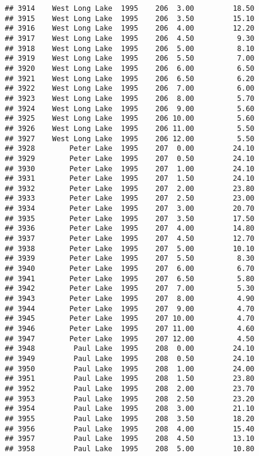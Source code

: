 \documentclass[
]{article}
\begin{document}
\begin{verbatim}
## 3914    West Long Lake  1995    206  3.00         18.50
## 3915    West Long Lake  1995    206  3.50         15.10
## 3916    West Long Lake  1995    206  4.00         12.20
## 3917    West Long Lake  1995    206  4.50          9.30
## 3918    West Long Lake  1995    206  5.00          8.10
## 3919    West Long Lake  1995    206  5.50          7.00
## 3920    West Long Lake  1995    206  6.00          6.50
## 3921    West Long Lake  1995    206  6.50          6.20
## 3922    West Long Lake  1995    206  7.00          6.00
## 3923    West Long Lake  1995    206  8.00          5.70
## 3924    West Long Lake  1995    206  9.00          5.60
## 3925    West Long Lake  1995    206 10.00          5.60
## 3926    West Long Lake  1995    206 11.00          5.50
## 3927    West Long Lake  1995    206 12.00          5.50
## 3928        Peter Lake  1995    207  0.00         24.10
## 3929        Peter Lake  1995    207  0.50         24.10
## 3930        Peter Lake  1995    207  1.00         24.10
## 3931        Peter Lake  1995    207  1.50         24.10
## 3932        Peter Lake  1995    207  2.00         23.80
## 3933        Peter Lake  1995    207  2.50         23.00
## 3934        Peter Lake  1995    207  3.00         20.70
## 3935        Peter Lake  1995    207  3.50         17.50
## 3936        Peter Lake  1995    207  4.00         14.80
## 3937        Peter Lake  1995    207  4.50         12.70
## 3938        Peter Lake  1995    207  5.00         10.10
## 3939        Peter Lake  1995    207  5.50          8.30
## 3940        Peter Lake  1995    207  6.00          6.70
## 3941        Peter Lake  1995    207  6.50          5.80
## 3942        Peter Lake  1995    207  7.00          5.30
## 3943        Peter Lake  1995    207  8.00          4.90
## 3944        Peter Lake  1995    207  9.00          4.70
## 3945        Peter Lake  1995    207 10.00          4.70
## 3946        Peter Lake  1995    207 11.00          4.60
## 3947        Peter Lake  1995    207 12.00          4.50
## 3948         Paul Lake  1995    208  0.00         24.10
## 3949         Paul Lake  1995    208  0.50         24.10
## 3950         Paul Lake  1995    208  1.00         24.00
## 3951         Paul Lake  1995    208  1.50         23.80
## 3952         Paul Lake  1995    208  2.00         23.70
## 3953         Paul Lake  1995    208  2.50         23.20
## 3954         Paul Lake  1995    208  3.00         21.10
## 3955         Paul Lake  1995    208  3.50         18.20
## 3956         Paul Lake  1995    208  4.00         15.40
## 3957         Paul Lake  1995    208  4.50         13.10
## 3958         Paul Lake  1995    208  5.00         10.80

\end{verbatim}
\end{document}
